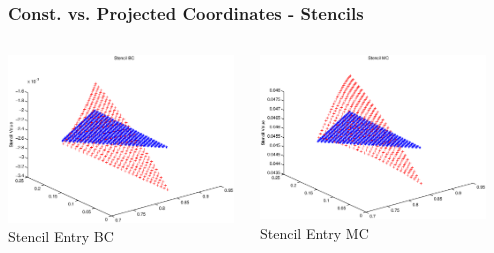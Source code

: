 \documentclass[t,compress=false,usepdftitle=false]{beamer}
\begin{document}
%
%
\begin{frame}\frametitle{Const. vs. Projected Coordinates - Stencils}

\begin{columns}[T] 
\begin{column}[T]{4.1cm} 
  \centering
  \includegraphics[width=0.98\textwidth]{stencilBC_nE}\\
  Stencil Entry BC
\end{column}\hfill
\begin{column}[T]{4.1cm} 
  \centering
  \includegraphics[width=0.98\textwidth]{stencilMC_nE}\\
  Stencil Entry MC
\end{column}\hfill
\begin{column}[T]{4.1cm} 

\end{column}
\end{columns}
\end{frame}
\end{document}
